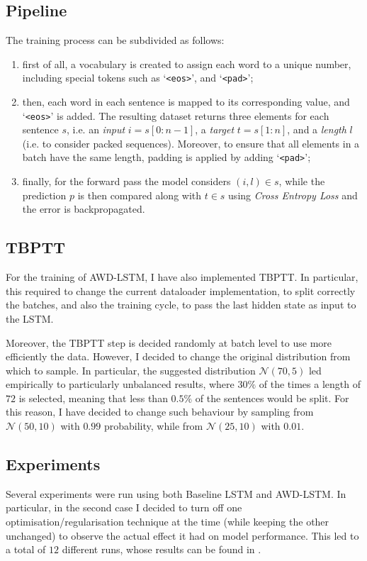 \subsection{Pipeline}
The training process can be subdivided as follows:
\begin{enumerate}
    \item first of all, a vocabulary is created to assign each word to a unique number, including special tokens such as `\texttt{<eos>}', and `\texttt{<pad>}';
    \item then, each word in each sentence is mapped to its corresponding value, and `\texttt{<eos>}' is added. The resulting dataset returns three elements for each sentence $s$, i.e. an \textit{input} $i = s[0:n-1]$, a  \textit{target} $t = s[1:n]$, and a \textit{length} $l$ (i.e. to consider packed sequences). Moreover, to ensure that all elements in a batch have the same length, padding is applied by adding `\texttt{<pad>}';
    \item finally, for the forward pass the model considers $(i, l) \in s$, while the prediction $p$ is then compared along with $t \in s$ using \textit{Cross Entropy Loss} and the error is backpropagated.
\end{enumerate}

\subsection{TBPTT}
For the training of AWD-LSTM, I have also implemented TBPTT. In particular, this required to change the current dataloader implementation, to split correctly the batches, and also the training cycle, to pass the last hidden state as input to the LSTM.

Moreover, the TBPTT step is decided randomly at batch level to use more efficiently the data. However, I decided to change the original distribution from which to sample. In particular, the suggested distribution $\mathcal{N}(70, 5)$ led empirically to particularly unbalanced results, where $30\%$ of the times a length of $72$ is selected, meaning that less than $0.5\%$ of the sentences would be split. For this reason, I have decided to change such behaviour by sampling from $\mathcal{N}(50, 10)$ with $0.99$ probability, while from $\mathcal{N}(25, 10)$ with $0.01$.

\subsection{Experiments}
Several experiments were run using both Baseline LSTM and AWD-LSTM. In particular, in the second case I decided to turn off one optimisation/regularisation technique at the time (while keeping the other unchanged) to observe the actual effect it had on model performance. This led to a total of $12$ different runs, whose results can be found in .